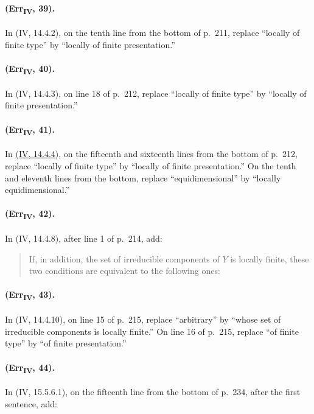 {\paragraph{(Err\textsubscript{IV}, 39).}
In (IV, 14.4.2), on the tenth line from the bottom of p.~211, replace
``locally of finite type'' by ``locally of finite presentation.''

\paragraph{(Err\textsubscript{IV}, 40).}
In (IV, 14.4.3), on line 18 of p.~212, replace ``locally of finite type''
by ``locally of finite presentation.''

\paragraph{(Err\textsubscript{IV}, 41).}
In ({\hyperlink{ega4.c04.cor.14-4-4}{IV, 14.4.4}}), on the fifteenth and sixteenth lines from the bottom of
p.~212, replace ``locally of finite type'' by ``locally of finite
presentation.''  On the tenth and eleventh lines from the bottom,
replace ``equidimensional'' by ``locally equidimensional.''

\paragraph{(Err\textsubscript{IV}, 42).}
In (IV, 14.4.8), after line 1 of p.~214, add:
\begin{quote}
If, in addition, the set of irreducible components of $Y$ is locally
finite, these two conditions are equivalent to the following ones:
\end{quote}

\paragraph{(Err\textsubscript{IV}, 43).}
In (IV, 14.4.10), on line 15 of p.~215, replace ``arbitrary'' by ``whose
set of irreducible components is locally finite.''  On line 16 of
p.~215, replace ``of finite type'' by ``of finite presentation.''

\paragraph{(Err\textsubscript{IV}, 44).}
In (IV, 15.5.6.1), on the fifteenth line from the bottom of p.~234,
after the first sentence, add:

}
